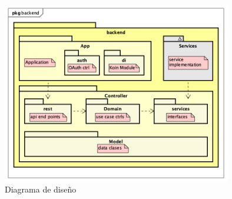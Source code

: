     \begin{figure}[H]
    \centering
        \includegraphics[width=10cm]{./img/arch/back/diagram.design.png}
        \caption{Diagrama de diseño}
        \label{fig:designdiagram}
    \end{figure}

